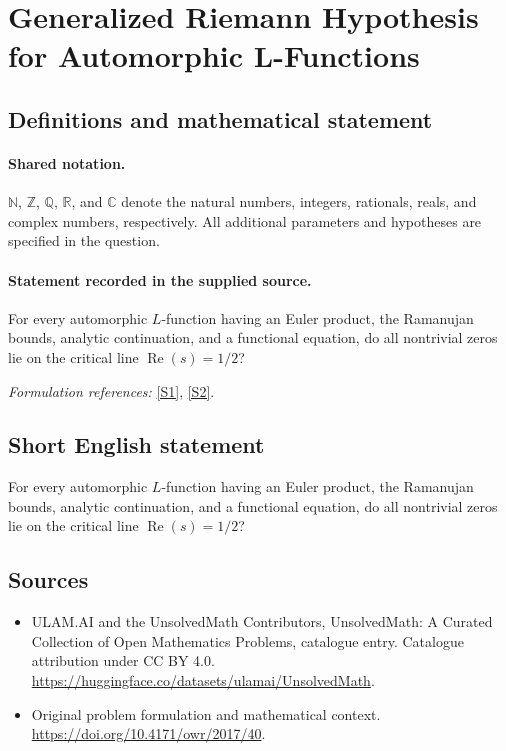 \documentclass[11pt]{article}
\newcommand{\sref}[2]{\hyperlink{source:#1:#2}{[S#2]}}
\begin{document}
\section{Generalized Riemann Hypothesis for Automorphic L-Functions}\label{statement}

\subsection{Definitions and mathematical statement}

\paragraph{Shared notation.}$\mathbb N$, $\mathbb Z$, $\mathbb Q$, $\mathbb R$, and $\mathbb C$ denote the natural numbers, integers, rationals, reals, and complex numbers, respectively. All additional parameters and hypotheses are specified in the question.


\paragraph{Statement recorded in the supplied source.}
For every automorphic $L$-function having an Euler product, the Ramanujan bounds, analytic continuation, and a functional equation, do all nontrivial zeros lie on the critical line $\operatorname{Re}(s)=1/2$?
\par\smallskip\textit{Formulation references:} \sref{statement}{1}, \sref{statement}{2}.
\subsection{Short English statement}
For every automorphic $L$-function having an Euler product, the Ramanujan bounds, analytic continuation, and a functional equation, do all nontrivial zeros lie on the critical line $\operatorname{Re}(s)=1/2$?
\subsection{Sources}
\begin{itemize}
\item[\hypertarget{source:statement:1}{S1}] ULAM.AI and the UnsolvedMath Contributors, UnsolvedMath: A Curated Collection of Open Mathematics Problems, catalogue entry. Catalogue attribution under CC BY 4.0.
\url{https://huggingface.co/datasets/ulamai/UnsolvedMath}.
\item[\hypertarget{source:statement:2}{S2}] Original problem formulation and mathematical context.
\url{https://doi.org/10.4171/owr/2017/40}.
\end{itemize}
\label{end:statement}
\end{document}
